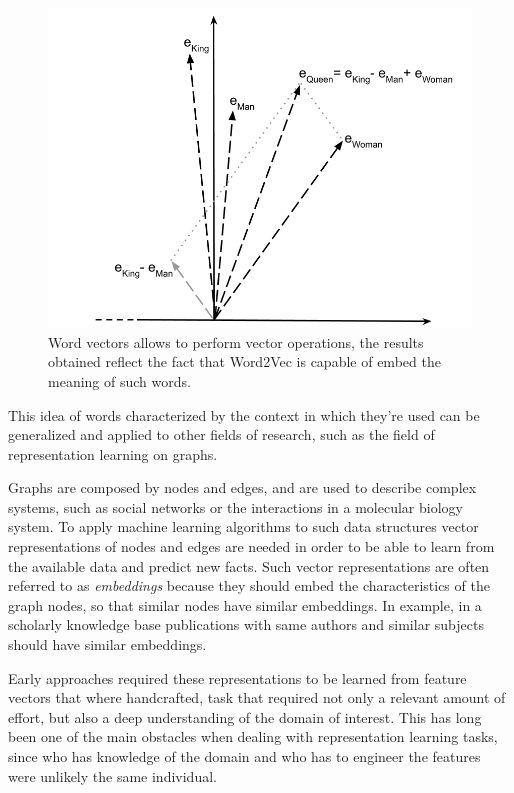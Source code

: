\documentclass[%
    corpo=13.5pt,
    twoside,
    oldstyle,
    tipotesi=magistrale,
    greek,
    evenboxes
]{toptesi}
\begin{document}
\begin{figure}[h]
    \centering
    \includegraphics[scale=0.4]{img/word2vec.png}
    \caption{
        Word vectors allows to perform vector operations, the results
        obtained reflect the fact that Word2Vec is capable of embed the
        meaning of such words.
    }
    \label{fig:word2vec}
    \end{figure}

This idea of words characterized by the context in which they're used
can be generalized and applied to other fields of research, such as
the field of representation learning on graphs.

Graphs are composed by nodes and edges, and are used to describe complex
systems, such as social networks or the interactions in a molecular biology
system. To apply machine learning algorithms to such data structures
vector representations of nodes and edges are needed in order
to be able to learn from the available data and predict new facts.
Such vector representations are often referred to as \emph{embeddings} because
they should embed the characteristics of the graph nodes, so that similar nodes
have similar embeddings. In example, in a scholarly knowledge base publications
with same authors and similar subjects should have similar embeddings.

Early approaches required these representations to be learned from feature
vectors that where handcrafted, task that required not
only a relevant amount of effort, but also a deep understanding of the domain
of interest. This has long been one of the main obstacles when dealing with
representation learning tasks, since who has knowledge of the domain and who
has to engineer the features were unlikely the same individual.
\end{document}
